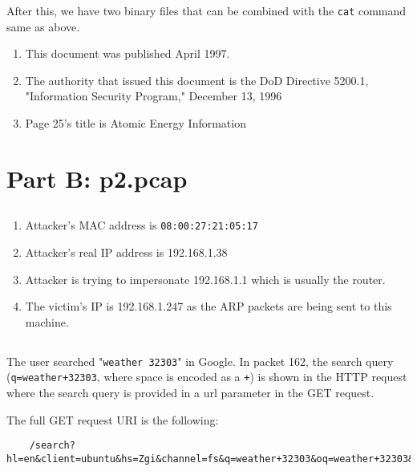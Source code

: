 \documentclass[12pt]{exam}
\begin{document}
After this, we have two binary files that can be combined with the
\lstinline{cat} command same as above.

\begin{enumerate}[label=\alph*)]
    \item This document was published April 1997.
    \item The authority that issued this document is the DoD Directive 5200.1,
    "Information Security Program," December 13, 1996
    \item Page 25's title is Atomic Energy Information
\end{enumerate}

\section{Part B: p2.pcap}

\subsection{}

\begin{enumerate}[label=\alph*)]
    \item Attacker's MAC address is \lstinline{08:00:27:21:05:17}
    \item Attacker's real IP address is 192.168.1.38
    \item Attacker is trying to impersonate 192.168.1.1 which is usually the
    router.
    \item The victim's IP is 192.168.1.247 as the ARP packets are being sent to
    this machine.
\end{enumerate}

\subsection{}

The user searched "\lstinline{weather 32303}" in Google.  In packet 162, the
search query (\lstinline{q=weather+32303}, where space is encoded as a
\lstinline{+}) is shown in the HTTP request where the search query is provided
in a url parameter in the GET request.

The full GET request URI is the following:

\begin{lstlisting}
    /search?hl=en&client=ubuntu&hs=Zgi&channel=fs&q=weather+32303&oq=weather+32303&gs_l=serp.3..0l2j0i30l2j0i5i30l3j0i8j0i8i30l2.44912.47718.0.48648.15.9.1.5.5.0.118.808.7j2.9.0.les%3B..0.0...1c.1.4.serp.hEw2INguST0
\end{lstlisting}
\end{document}
